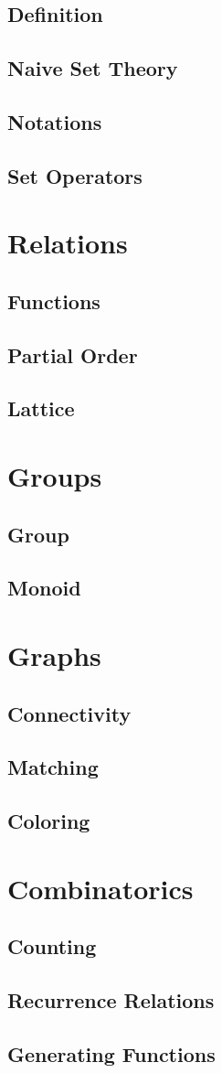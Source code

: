 \documentclass{book}
\begin{document}
\subsection{Definition}
\subsection{Naive Set Theory}
\subsection{Notations}
\subsection{Set Operators}

\section{Relations}
\subsection{Functions}
\subsection{Partial Order}
\subsection{Lattice}

\section{Groups}
\subsection{Group}
\subsection{Monoid}

\section {Graphs}
\subsection {Connectivity}
\subsection {Matching}
\subsection {Coloring}

\section {Combinatorics}
\subsection {Counting}
\subsection {Recurrence Relations}
\subsection {Generating Functions}
\end{document}
